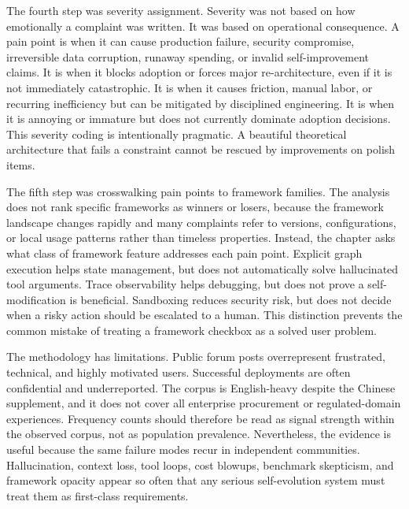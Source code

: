 The fourth step was severity assignment. Severity was not based on how emotionally a complaint was written. It was based on operational consequence. A pain point is \sevcritical{} when it can cause production failure, security compromise, irreversible data corruption, runaway spending, or invalid self-improvement claims. It is \sevhigh{} when it blocks adoption or forces major re-architecture, even if it is not immediately catastrophic. It is \sevmedium{} when it causes friction, manual labor, or recurring inefficiency but can be mitigated by disciplined engineering. It is \sevlow{} when it is annoying or immature but does not currently dominate adoption decisions. This severity coding is intentionally pragmatic. A beautiful theoretical architecture that fails a \sevcritical{} constraint cannot be rescued by improvements on \sevmedium{} polish items.

The fifth step was crosswalking pain points to framework families. The analysis does not rank specific frameworks as winners or losers, because the framework landscape changes rapidly and many complaints refer to versions, configurations, or local usage patterns rather than timeless properties. Instead, the chapter asks what class of framework feature addresses each pain point. Explicit graph execution helps state management, but does not automatically solve hallucinated tool arguments. Trace observability helps debugging, but does not prove a self-modification is beneficial. Sandboxing reduces security risk, but does not decide when a risky action should be escalated to a human. This distinction prevents the common mistake of treating a framework checkbox as a solved user problem.

The methodology has limitations. Public forum posts overrepresent frustrated, technical, and highly motivated users. Successful deployments are often confidential and underreported. The corpus is English-heavy despite the Chinese supplement, and it does not cover all enterprise procurement or regulated-domain experiences. Frequency counts should therefore be read as signal strength within the observed corpus, not as population prevalence. Nevertheless, the evidence is useful because the same failure modes recur in independent communities. Hallucination, context loss, tool loops, cost blowups, benchmark skepticism, and framework opacity appear so often that any serious self-evolution system must treat them as first-class requirements.

